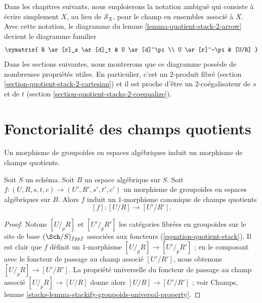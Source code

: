 \begin{remark}
\label{remark-fundamental-square}
Dans les chapitres suivants, nous emploierons la notation ambiguë qui consiste à écrire simplement $X$, au lieu de $\mathcal{S}_X$, pour le champ en ensembles associé à $X$. Avec cette notation, le diagramme du lemme \ref{lemma-quotient-stack-2-arrow} devient le diagramme familier
$$
\xymatrix{
R \ar[r]_s \ar[d]_t & U \ar[d]^\pi \\
U \ar[r]^-\pi & [U/R]
}
$$
Dans les sections suivantes, nous montrerons que ce diagramme possède de nombreuses propriétés utiles. En particulier, c'est un $2$-produit fibré (section \ref{section-quotient-stack-2-cartesian}) et il est proche d'être un $2$-coégalisateur de $s$ et de $t$ (section \ref{section-quotient-stacks-2-coequalize}).
\end{remark}




\section{Fonctorialité des champs quotients}
\label{section-functoriality-quotient-stacks}

\noindent
Un morphisme de groupoïdes en espaces algébriques induit un morphisme de champs quotients.

\begin{lemma}
\label{lemma-quotient-stack-functorial}
Soit $S$ un schéma. Soit $B$ un espace algébrique sur $S$. Soit $f : (U, R, s, t, c) \to (U', R', s', t', c')$ un morphisme de groupoïdes en espaces algébriques sur $B$. Alors $f$ induit un $1$-morphisme canonique de champs quotients
$$
[f] : [U/R] \longrightarrow [U'/R'].
$$
\end{lemma}

\begin{proof}
Notons $[U/_{\!p}R]$ et $[U'/_{\!p}R']$ les catégories fibrées en groupoïdes sur le site de base $(\Sch/S)_{fppf}$ associées aux foncteurs (\ref{equation-quotient-stack}). Il est clair que $f$ définit un $1$-morphisme $[U/_{\!p}R] \to [U'/_{\!p}R']$ ; en le composant avec le foncteur de passage au champ associé $[U'/R']$, nous obtenons $[U/_{\!p}R] \to [U'/R']$. La propriété universelle du foncteur de passage au champ associé $[U/_{\!p}R] \to [U/R]$ donne alors $[U/R] \to [U'/R']$ ; voir Champs, lemme \ref{stacks-lemma-stackify-groupoids-universal-property}.
\end{proof}

